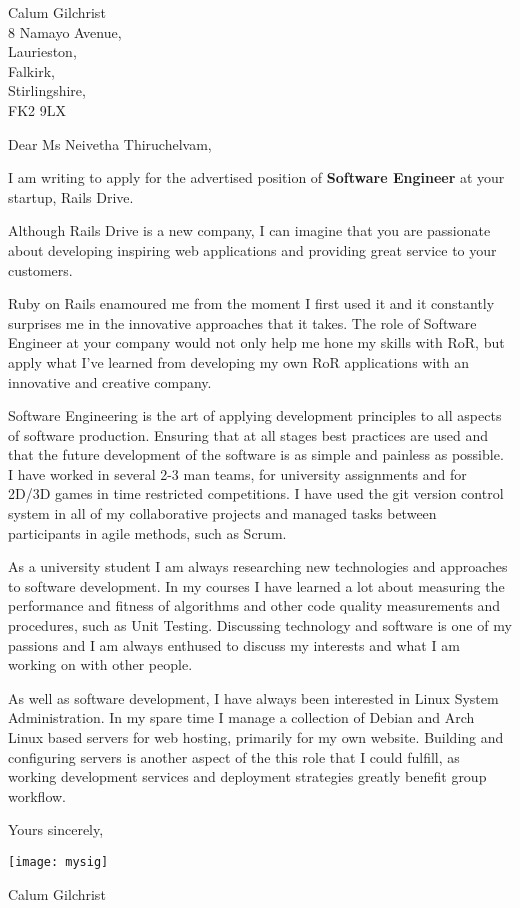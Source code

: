 
\begin{minipage}[t]{0.495\textwidth}
  Calum Gilchrist \\
  8 Namayo Avenue, \\
  Laurieston, \\
  Falkirk, \\
  Stirlingshire, \\
  FK2 9LX
\end{minipage}

\medskip

\setlength{\parskip}{0.5em}

Dear Ms Neivetha Thiruchelvam,

I am writing to apply for the advertised position of \textbf{Software Engineer}
at your startup, Rails Drive.

Although Rails Drive is a new company, I can imagine that you are passionate
about developing inspiring web applications and providing great service to your
customers. 

Ruby on Rails enamoured me from the moment I first used it and it constantly
surprises me in the innovative approaches that it takes. The role of Software
Engineer at your company would not only help me hone my skills with RoR, but
apply what I've learned from developing my own RoR applications with an
innovative and creative company.

Software Engineering is the art of applying development principles to all
aspects of software production. Ensuring that at all stages best practices are
used and that the future development of the software is as simple and painless
as possible. I have worked in several 2-3 man teams, for university assignments
and for 2D/3D games in time restricted competitions. I have used the git version
control system in all of my collaborative projects and managed tasks between
participants in agile methods, such as Scrum.

As a university student I am always researching new technologies and approaches
to software development. In my courses I have learned a lot about measuring the
performance and fitness of algorithms and other code quality measurements and
procedures, such as Unit Testing.  Discussing technology and software is one of
my passions and I am always enthused to discuss my interests and what I am
working on with other people.

As well as software development, I have always been interested in Linux System
Administration. In my spare time I manage a collection of Debian and Arch Linux
based servers for web hosting, primarily for my own website. Building and
configuring servers is another aspect of the this role that I could fulfill, as
working development services and deployment strategies greatly benefit group
workflow.

\bigskip
Yours sincerely,

\texttt{[image: mysig]}

Calum Gilchrist
